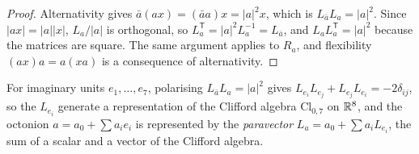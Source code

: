 \begin{proof}
Alternativity gives $\bar a(ax)=(\bar aa)x=|a|^2x$, which is $L_{\bar a}L_a=|a|^2$. Since $|ax|=|a||x|$, $L_a/|a|$ is orthogonal, so $L_a^{\mathsf T}=|a|^2L_a^{-1}=L_{\bar a}$, and $L_aL_a^{\mathsf T}=|a|^2$ because the matrices are square. The same argument applies to $R_a$, and flexibility $(ax)a=a(xa)$ is a consequence of alternativity.
\end{proof}

For imaginary units $e_1,\dots,e_7$, polarising $L_{\bar a}L_a=|a|^2$ gives $L_{e_i}L_{e_j}+L_{e_j}L_{e_i}=-2\delta_{ij}$, so the $L_{e_i}$ generate a representation of the Clifford algebra $\mathrm{Cl}_{0,7}$ on $\mathbb{R}^8$, and the octonion $a=a_0+\sum a_ie_i$ is represented by the \emph{paravector} $L_a=a_0+\sum a_iL_{e_i}$, the sum of a scalar and a vector of the Clifford algebra.

